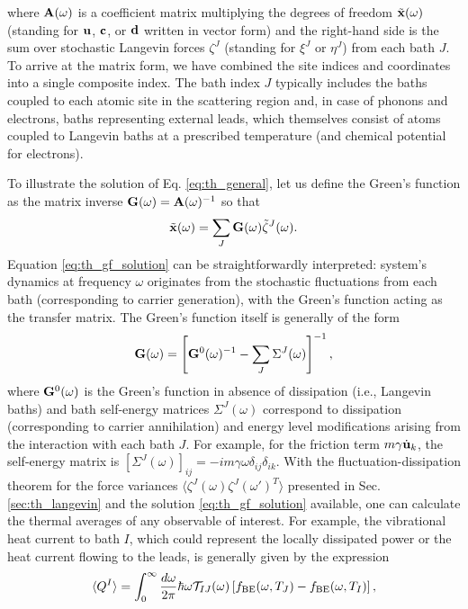 where $\mathbf{A}(\omega)$ is a coefficient matrix multiplying the degrees of freedom $\tilde{\mathbf{x}}(\omega)$ (standing for $\mathbf{u}$, $\mathbf{c}$, or $\mathbf{d}$ written in vector form) and the right-hand side is the sum over stochastic Langevin forces $\zeta^J$ (standing for $\xi^J$ or $\eta^J$) from each bath $J$. To arrive at the matrix form, we have combined the site indices and coordinates into a single composite index. The bath index $J$ typically includes the baths coupled to each atomic site in the scattering region and, in case of phonons and electrons, baths representing external leads, which themselves consist of atoms coupled to Langevin baths at a prescribed temperature (and chemical potential for electrons). 

To illustrate the solution of Eq. \eqref{eq:th_general}, let us define the Green's function as the matrix inverse $\mathbf{G}(\omega)=\mathbf{A}(\omega)^{-1}$ so that  
\begin{equation}
 \tilde{\mathbf{x}}(\omega)  = \sum_J \mathbf{G}(\omega)\tilde \zeta^J(\omega). \label{eq:th_gf_solution}
\end{equation}
Equation \eqref{eq:th_gf_solution} can be straightforwardly interpreted: system's dynamics at frequency $\omega$ originates from the stochastic fluctuations from each bath (corresponding to carrier generation), with the Green's function acting as the transfer matrix. The Green's function itself is generally of the form
\begin{equation}
 \mathbf{G}(\omega) = \left[\mathbf{G}^0(\omega)^{-1} - \sum_J \Sigma^J(\omega) \right]^{-1},
\end{equation}
where $\mathbf{G}^0(\omega)$ is the Green's function in absence of dissipation (i.e., Langevin baths) and bath self-energy matrices $\Sigma^J(\omega)$ correspond to dissipation (corresponding to carrier annihilation) and energy level modifications arising from the interaction with each bath $J$. For example, for the friction term $m\gamma \dot{\mathbf{u}}_k$, the self-energy matrix is $[\Sigma^J(\omega)]_{ij}=-im\gamma \omega \delta_{ij} \delta_{ik}$. With the fluctuation-dissipation theorem for the force variances $\langle \zeta^J(\omega) \zeta^J(\omega')^T \rangle$ presented in Sec. \ref{sec:th_langevin} and the solution \eqref{eq:th_gf_solution} available, one can calculate the thermal averages of any observable of interest. For example, the vibrational heat current to bath $I$, which could represent the locally dissipated power or the heat current flowing to the leads, is generally given by the expression
\begin{equation}
 \langle Q^I \rangle = \int_0^{\infty} \frac{d\omega}{2\pi} \hbar \omega \mathcal{T}_{IJ}(\omega) \left[ f_{\textrm{BE}}(\omega,T_J)- f_{\textrm{BE}}(\omega,T_I)\right], \label{eq:th_QI}
\end{equation}
